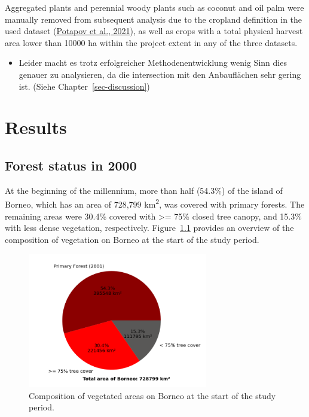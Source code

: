 \documentclass[
  letterpaper,
  DIV=11,
  numbers=noendperiod]{scrreprt}
\providecommand{\tightlist}{%
  \setlength{\itemsep}{0pt}\setlength{\parskip}{0pt}}\usepackage{longtable,booktabs,array}
\begin{document}
Aggregated plants and perennial woody plants such as coconut and oil
palm were manually removed from subsequent analysis due to the cropland
definition in the used dataset
(\protect\hyperlink{ref-potapovGlobalMapsCropland2021}{Potapov et al.,
2021}), as well as crops with a total physical harvest area lower than
10000 ha within the project extent in any of the three datasets.

\begin{itemize}
\tightlist
\item
  Leider macht es trotz erfolgreicher Methodenentwicklung wenig Sinn
  dies genauer zu analysieren, da die intersection mit den Anbauflächen
  sehr gering ist. (Siehe Chapter~\ref{sec-discussion})
\end{itemize}


\hypertarget{results}{%
\chapter{Results}\label{results}}

\hypertarget{forest-status-in-2000}{%
\section{Forest status in 2000}\label{forest-status-in-2000}}

At the beginning of the millennium, more than half (54.3\%) of the
island of Borneo, which has an area of 728,799 km\textsuperscript{2},
was covered with primary forests. The remaining areas were 30.4\%
covered with \textgreater= 75\% closed tree canopy, and 15.3\% with less
dense vegetation, respectively. Figure~\ref{fig-piefcover2000} provides
an overview of the composition of vegetation on Borneo at the start of
the study period.

\begin{figure}

{\centering \includegraphics[width=0.7\textwidth,height=\textheight]{text/../code/results/final_plots/fcover_2000.png}

}

\caption{\label{fig-piefcover2000}Composition of vegetated areas on
Borneo at the start of the study period.}

\end{figure}
\end{document}
